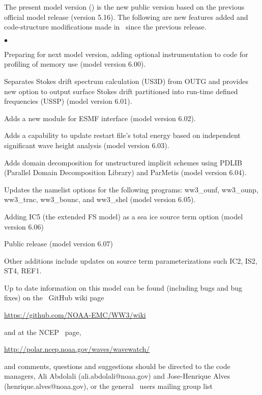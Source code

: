 \vspace{\baselineskip} 
\noindent 
The present model version (\WWver) is the new public version based on the
previous official model release (version 5.16). The following are new features added 
and code-structure modifications made in \ws\ \WWver since the previous release.

\begin{list}{$\bullet$}{\rightmargin 5mm \parsep 0mm \itemsep 0mm}

\item Preparing for next model version, adding optional instrumentation to code
      for profiling of memory use (model version 6.00).

\item Separates Stokes drift spectrum calculation (US3D) from OUTG and provides 
      new option to output surface Stokes drift partitioned into run-time defined 
      frequencies (USSP) (model version 6.01).  

\item Adds a new module for ESMF interface (model version 6.02). 

\item Adds a capability to update restart file's total energy based on independent 
      significant wave height analysis (model version 6.03).

\item Adds domain decomposition for unstructured implicit schemes using PDLIB
      (Parallel Domain Decomposition Library) and ParMetis (model version 6.04).

\item Updates the namelist options for the following programs: ww3\_ounf, ww3\_ounp, 
      ww3\_trnc, ww3\_bounc, and ww3\_shel (model version 6.05).

\item Adding IC5 (the extended FS model) as a sea ice source term option (model version 6.06)

\item Public release (model version 6.07)

\end{list}

Other additions include updates on source term parameterizations such IC2, IS2, ST4, REF1.


\vspace{\baselineskip} \noindent 
Up to date information on this model can be found (including bugs and bug
fixes) on the \ws\ GitHub wiki page
\begin{center}
\url{https://github.com/NOAA-EMC/WW3/wiki}
\end{center}
and at the NCEP \ws\ page, 
\begin{center}
\url{http://polar.ncep.noaa.gov/waves/wavewatch/}
\end{center}
and comments, questions and suggestions should be
directed to the code managers, Ali Abdolali (ali.abdolali@noaa.gov) and Jose-Henrique Alves (henrique.alves@noaa.gov), or the general \ws\ users mailing group list


